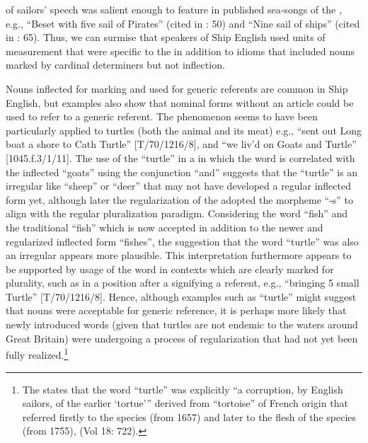 of sailors’ speech was salient enough to feature in published sea-songs of the , e.g., “Beset with five sail of Pirates” (cited in \citealt{Palmer1986}: 50) and “Nine sail of ships” (cited in \citealt{Palmer1986}: 65). Thus, we can surmise that speakers of Ship English used   units of measurement that were specific to the  in addition to idioms that included  nouns marked by cardinal determiners but not inflection. 

Nouns inflected for  marking and used for generic referents are common in Ship English, but examples also show that  nominal forms without an article could be used to refer to a generic referent. The phenomenon seems to have been particularly applied to turtles (both the animal and its meat) e.g., “sent out Long boat a shore to Cath Turtle” [T/70/1216/8], and “we liv’d on Goats and Turtle” [1045.f.3/1/11]. The use of the   “turtle” in a  in which the word is correlated with the inflected  “goats” using the conjunction “and” suggests that the  “turtle” is an irregular  like “sheep” or “deer” that may not have developed a regular inflected form yet, although later the regularization of the  adopted the morpheme “-s” to align with the regular pluralization paradigm. Considering the word “fish” and the traditional   “fish” which is now accepted in addition to the newer and regularized inflected form “fishes”, the suggestion that the word “turtle” was also an irregular  appears more plausible. This interpretation furthermore appears to be supported by usage of the word in contexts which are clearly marked for plurality, such as in a position after a  signifying a  referent, e.g., “bringing 5 small Turtle” [T/70/1216/8]. Hence, although examples such as “turtle” might suggest that  nouns were acceptable for generic reference, it is perhaps more likely that newly introduced words (given that turtles are not endemic to the waters around Great Britain) were undergoing a process of regularization that had not yet been fully realized.\footnote{The \citet{oed1989} states that the word “turtle” was explicitly “a corruption, by English sailors, of the earlier ‘tortue’” derived from “tortoise” of French origin that referred firstly to the species (from 1657) and later to the flesh of the species (from 1755), (Vol 18: 722).} 

